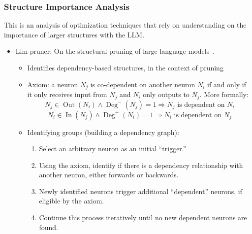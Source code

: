 
\subsubsection{Structure Importance Analysis}\label{subsubsec:strucure-importance-analysis}

This is an analysis of optimization techniques that rely on understanding on the importance of larger structures with the LLM\@.
\begin{itemize}
    \item Llm-pruner: On the structural pruning of large language models~\cite{ma2023llm}.
    \begin{itemize}
        \item Identifies dependency-based structures, in the context of pruning
        \item Axiom: a neuron $N_j$ is co-dependent on another neuron $N_i$ if and only if it only receives input from $N_j$ and $N_i$ only outputs to $N_j$.
        More formally:
        \begin{equation}
            N_j \in \operatorname{Out}(N_i) \wedge \operatorname{Deg}^-(N_j) = 1 \Rightarrow N_j \text{ is dependent on } N_i\label{eq:equation}
        \end{equation}
        \begin{equation}
            N_i \in \operatorname{In}(N_j) \wedge \operatorname{Deg}^+(N_i) = 1 \Rightarrow N_i \text{ is dependent on } N_j\label{eq:equation2}
        \end{equation}
        \item Identifying groups (building a dependency graph):
        \begin{enumerate}
            \item Select an arbitrary neuron as an initial ``trigger.''
            \item Using the axiom, identify if there is a dependency relationship with another neuron, either forwards or backwards.
            \item Newly identified neurons trigger additional ``dependent'' neurons, if eligible by the axiom.
            \item Continue this process iteratively until no new dependent neurons are found.
        \end{enumerate}

\end{itemize}
\end{itemize}
